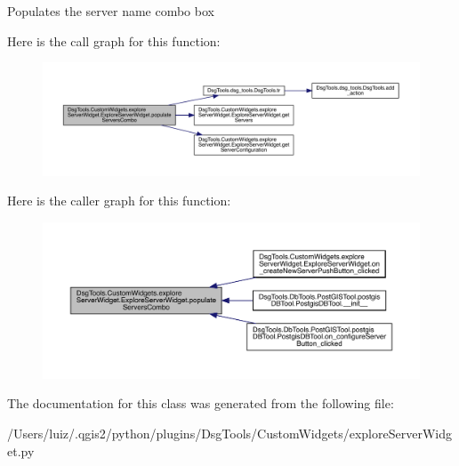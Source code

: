 \begin{DoxyVerb}Populates the server name combo box
\end{DoxyVerb}
 Here is the call graph for this function\+:
\nopagebreak
\begin{figure}[H]
\begin{center}
\leavevmode
\includegraphics[width=350pt]{class_dsg_tools_1_1_custom_widgets_1_1explore_server_widget_1_1_explore_server_widget_a0f623e6eb0c758c98e1868f770f13eaf_cgraph}
\end{center}
\end{figure}
Here is the caller graph for this function\+:
\nopagebreak
\begin{figure}[H]
\begin{center}
\leavevmode
\includegraphics[width=350pt]{class_dsg_tools_1_1_custom_widgets_1_1explore_server_widget_1_1_explore_server_widget_a0f623e6eb0c758c98e1868f770f13eaf_icgraph}
\end{center}
\end{figure}


The documentation for this class was generated from the following file\+:\begin{DoxyCompactItemize}
\item 
/\+Users/luiz/.\+qgis2/python/plugins/\+Dsg\+Tools/\+Custom\+Widgets/explore\+Server\+Widget.\+py\end{DoxyCompactItemize}
